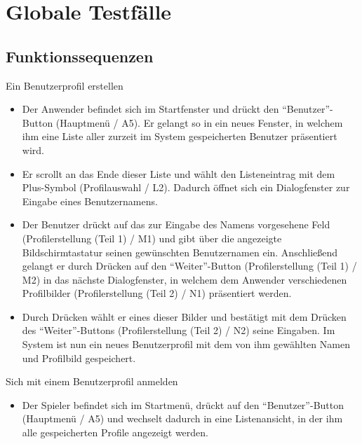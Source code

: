 \section{Globale Testfälle}

\subsection{Funktionssequenzen}

\begin{requirements}

	 Ein Benutzerprofil erstellen
	
	
	\begin{itemize}
  			\item Der Anwender befindet sich im Startfenster und drückt den "`Benutzer"'-Button (Hauptmenü / A5). Er gelangt so in ein neues Fenster, in welchem ihm eine Liste aller zurzeit im System gespeicherten Benutzer präsentiert wird.
  			
  			\item Er scrollt an das Ende dieser Liste und wählt den Listeneintrag mit dem Plus-Symbol (Profilauswahl / L2). Dadurch öffnet sich ein Dialogfenster zur Eingabe eines Benutzernamens.
  			
  			\item Der Benutzer drückt auf das zur Eingabe des Namens vorgesehene Feld (Profilerstellung (Teil 1) / M1) und gibt über die angezeigte Bildschirmtastatur seinen gewünschten Benutzernamen ein. Anschließend gelangt er durch Drücken auf den "`Weiter"'-Button (Profilerstellung (Teil 1) / M2) in das nächste Dialogfenster, in welchem dem Anwender verschiedenen Profilbilder (Profilerstellung (Teil 2) / N1) präsentiert werden.
  			
  			\item Durch Drücken wählt er eines dieser Bilder und bestätigt mit dem Drücken des "`Weiter"'-Buttons (Profilerstellung (Teil 2) / N2) seine Eingaben. Im System ist nun ein neues Benutzerprofil mit dem von ihm gewählten Namen und Profilbild gespeichert.
  	\end{itemize}
  	
  	
  	
  	 Sich mit einem Benutzerprofil anmelden
  	
  	\begin{itemize}
  			\item Der Spieler befindet sich im Startmenü, drückt auf den "`Benutzer"'-Button (Hauptmenü / A5) und wechselt dadurch in eine Listenansicht, in der ihm alle gespeicherten Profile angezeigt werden.
  			

\end{itemize}
\end{requirements}
